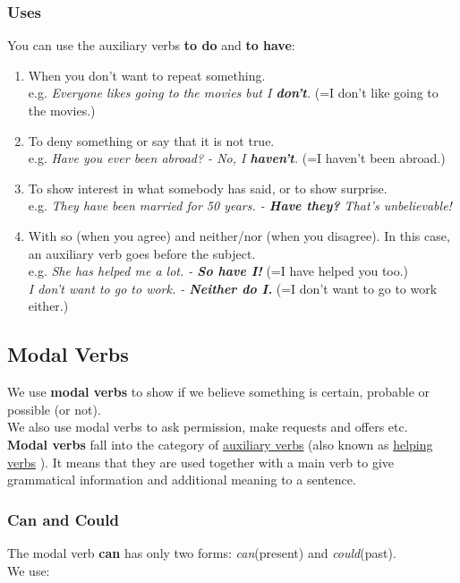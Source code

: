 \documentclass[hidelinks,10pt,a4paper]{article}
\begin{document}
\subsubsection{Uses}
You can use the auxiliary verbs \textbf{to do} and \textbf{to have}:
\begin{enumerate}[label=(\alph*)]
	\item When you don't want to repeat something. \\
		e.g. \textit{Everyone likes going to the movies but I \textbf{don't}.} (=I don't like going to the movies.)
	\item To deny something or say that it is not true. \\
		e.g. \textit{Have you ever been abroad? - No, I \textbf{haven't}.} (=I haven't been abroad.)
	\item To show interest in what somebody has said, or to show surprise. \\
		e.g. \textit{They have been married for 50 years. - \textbf{Have they?} That's unbelievable! }
	\item With so (when you agree) and neither/nor (when you disagree). In this case, an auxiliary verb goes before the subject. \\
		e.g. \textit{She has helped me a lot. - \textbf{So have I!}} (=I have helped you too.) \\
		\textit{I don't want to go to work. - \textbf{Neither do I.}} (=I don't want to go to work either.)
\end{enumerate}

\subsection{Modal Verbs}
We use \textbf{modal verbs} to show if we believe something is certain, probable or possible (or not).\\

We also use modal verbs to ask permission, make requests and offers etc.\\

\textbf{Modal verbs} fall into the category of \underline{auxiliary verbs} (also known as \underline{helping verbs} ). It means that they are used together with a main verb to give grammatical information and additional meaning to a sentence.

\subsubsection{Can and Could}
The modal verb \textbf{can} has only two forms: \textit{can}(present) and \textit{could}(past).\\We use:
\end{document}
